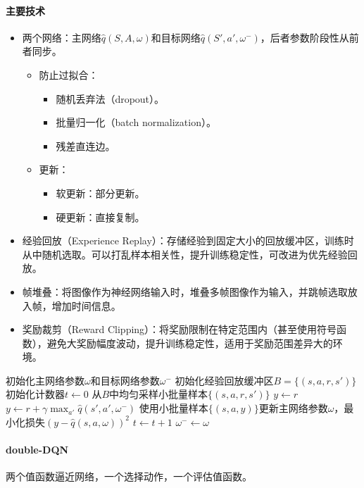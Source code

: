 \documentclass[
12pt, %
a4paper, 
oneside, %
headinclude,footinclude, %
]{scrartcl}
\begin{document}
\paragraph{主要技术}
\begin{itemize}
\item 两个网络：主网络$ \hat{q}(S, A, \omega) $和目标网络$ \hat{q}(S', a', \omega^-) $，后者参数阶段性从前者同步。
\begin{itemize}
\item 防止过拟合：
\begin{itemize}
\item 随机丢弃法（dropout）。
\item 批量归一化（batch normalization）。
\item 残差直连边。
\end{itemize}
\item 更新：
\begin{itemize}
\item 软更新：部分更新。
\item 硬更新：直接复制。
\end{itemize}
\end{itemize}
\item 经验回放（Experience Replay）：存储经验到固定大小的回放缓冲区，训练时从中随机选取。可以打乱样本相关性，提升训练稳定性，可改进为优先经验回放。
\item 帧堆叠：将图像作为神经网络输入时，堆叠多帧图像作为输入，并跳帧选取放入帧，增加时间信息。
\item 奖励裁剪（Reward Clipping）：将奖励限制在特定范围内（甚至使用符号函数），避免大奖励幅度波动，提升训练稳定性，适用于奖励范围差异大的环境。
\end{itemize}
\begin{myalgorithm}[DQN]
\State 初始化主网络参数$ \omega $和目标网络参数$ \omega^- $
\State 初始化经验回放缓冲区$ B = \{(s, a, r, s')\} $
\State 初始化计数器$ t \gets 0 $
\Loop
\State 从$ B $中均匀采样小批量样本$ \{(s, a, r, s')\} $
\State $ y \gets r $
\Else
\State $ y \gets r + \gamma \max_{a'} \hat{q}(s', a', \omega^-) $ 
\EndIf
\EndFor
\State 使用小批量样本$ \{(s, a, y)\} $更新主网络参数$ \omega $，最小化损失$ (y - \hat{q}(s, a, \omega))^2 $
\State $ t \gets t + 1 $
 
\State $ \omega^- \gets \omega $
\EndIf
\EndLoop
\end{myalgorithm}
\paragraph{double-DQN}
两个值函数逼近网络，一个选择动作，一个评估值函数。
\end{document}
